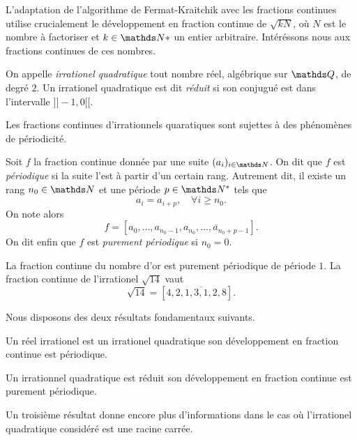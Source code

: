 L'adaptation de l'algorithme de Fermat-Kraitchik avec les fractions continues
utilise crucialement le développement en fraction continue de $\sqrt{kN}$, où
$N$ est le nombre à factoriser et $k\in \N*$ un entier arbitraire. Intéréssons
nous aux fractions continues de ces nombres.

\begin{definition}
	On appelle \emph{irrationel quadratique} tout nombre réel, algébrique sur
	$\Q$, de degré $2$. Un irrationel quadratique est dit \emph{réduit} si son
	conjugué est dans l'intervalle $]\!]-1, 0[\![$.
\end{definition}

Les fractions continues d'irrationnels quaratiques sont sujettes à des
phénomènes de périodicité.

\begin{definition}
	Soit $f$ la fraction continue donnée par une suite $(a_i)_{i\in \N}$. On
	dit que $f$ est \emph{périodique} si la suite l'est à partir d'un certain
	rang.  Autrement dit, il existe un rang $n_0\in \N$ et une période $p\in
	\N^*$ tels que \[a_{i} = a_{i+p}, \quad \forall i\geq n_0.\] On note alors
	\[f = [a_0, \dots, a_{n_0 - 1}, \overline{a_{n_0}, \dots, a_{n_0 + p
	-1}}].\] On dit enfin que $f$ est \emph{purement périodique} si $n_0 = 0$.
\end{definition}

\begin{exemple}
	La fraction continue du nombre d'or est purement périodique de période $1$.
	La fraction continue de l'irrationel $\sqrt{14}$ vaut \[\sqrt{14} = [4,
	\overline{2, 1, 3, 1, 2, 8}].\]
\end{exemple}

Nous disposons des deux résultats fondamentaux suivants.

\begin{theoreme}[Lagrange, 1770]
	Un réel irrationel est un irrationel quadratique \ssi son développement en
	fraction continue est périodique.
\end{theoreme}

\begin{theoreme}[Galois, 1829]
	Un irrationnel quadratique est réduit \ssi son développement en fraction
	continue est purement périodique.
\end{theoreme}

Un troisième résultat donne encore plus d'informations dans le cas où
l'irrationel quadratique considéré est une racine carrée.

